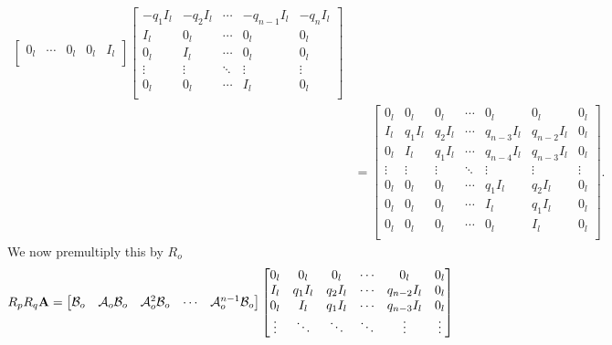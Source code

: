 \begin{appendices}
\begin{equation*}
\begin{split}
\begin{bmatrix}
            0_l & \cdots & 0_l & 0_l & I_l \\
        \end{bmatrix}
        \begin{bmatrix}
            -q_1I_l & -q_2I_l & \cdots & -q_{n-1}I_l & -q_nI_l \\
            I_l & 0_l & \cdots & 0_l & 0_l \\
            0_l & I_l & \cdots & 0_l & 0_l \\
            \vdots & \vdots & \ddots & \vdots & \vdots \\
            0_l & 0_l & \cdots & I_l & 0_l \\
        \end{bmatrix} \\
        &= 
        \begin{bmatrix}
            0_l & 0_l & 0_l & \cdots & 0_l & 0_l & 0_l \\
            I_l & q_1I_l & q_2I_l & \cdots & q_{n-3}I_l & q_{n-2}I_l & 0_l \\ 
            0_l & I_l & q_1I_l & \cdots & q_{n-4}I_l & q_{n-3}I_l & 0_l \\ 
            \vdots & \vdots & \vdots & \ddots & \vdots & \vdots & \vdots \\
            0_l & 0_l & 0_l & \cdots & q_1I_l & q_2I_l & 0_l \\
            0_l & 0_l & 0_l & \cdots & I_l & q_1I_l & 0_l \\
            0_l & 0_l & 0_l & \cdots & 0_l & I_l & 0_l \\
        \end{bmatrix}.
    \end{split} 
\end{equation*}
We now premultiply this by $R_o$
\begin{equation*}
    \begin{split}
        R_pR_q\mathbf{A} &= 
        \begin{bmatrix}
            \mathcal{B}_o & \mathcal{A}_o\mathcal{B}_o & \mathcal{A}^{2}_o\mathcal{B}_o & \cdots & \mathcal{A}^{n-1}_o\mathcal{B}_o \\
        \end{bmatrix}
        \begin{bmatrix}
            0_l & 0_l & 0_l & \cdots & 0_l & 0_l \\
            I_l & q_1I_l & q_2I_l & \cdots & q_{n-2}I_l & 0_l \\ 
            0_l & I_l & q_1I_l & \cdots & q_{n-3}I_l & 0_l \\ 
            \vdots & \ddots & \ddots & \ddots & \vdots & \vdots \\

\end{bmatrix}
\end{split}
\end{equation*}
\end{appendices}
